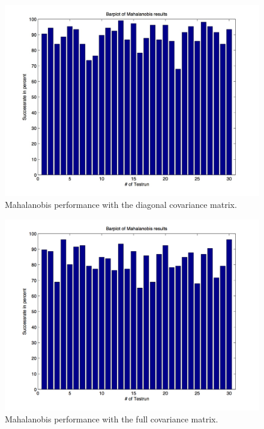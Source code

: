 \documentclass[subfigure,epsfig,fleqn,amssmb,float,caption,ausarbeitung]{scrartcl}
\begin{document}
\begin{figure}
	\centering
	\includegraphics[scale=0.75]{img/mahalanobis_results_diag_covmat.jpg}
	\caption{Mahalanobis performance with the diagonal covariance matrix.}
	\label{mahal2}
\end{figure}

\begin{figure}
	\centering
	\includegraphics[scale=0.75]{img/mahalanobis_results_full_covmat.jpg}
	\caption{Mahalanobis performance with the full covariance matrix.}
	\label{mahal3}
\end{figure}
\end{document}
